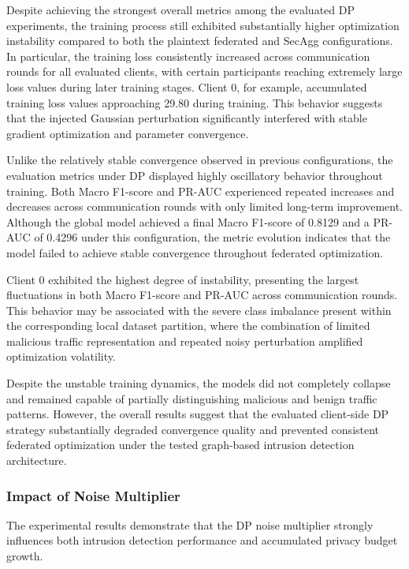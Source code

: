 \documentclass[conference]{IEEEtran}
\begin{document}
Despite achieving the strongest overall metrics among the evaluated DP experiments, the training process still exhibited substantially higher optimization instability compared to both the plaintext federated and SecAgg configurations. In particular, the training loss consistently increased across communication rounds for all evaluated clients, with certain participants reaching extremely large loss values during later training stages. Client 0, for example, accumulated training loss values approaching 29.80 during training. This behavior suggests that the injected Gaussian perturbation significantly interfered with stable gradient optimization and parameter convergence.

Unlike the relatively stable convergence observed in previous configurations, the evaluation metrics under DP displayed highly oscillatory behavior throughout training. Both Macro F1-score and PR-AUC experienced repeated increases and decreases across communication rounds with only limited long-term improvement. Although the global model achieved a final Macro F1-score of 0.8129 and a PR-AUC of 0.4296 under this configuration, the metric evolution indicates that the model failed to achieve stable convergence throughout federated optimization.

Client 0 exhibited the highest degree of instability, presenting the largest fluctuations in both Macro F1-score and PR-AUC across communication rounds. This behavior may be associated with the severe class imbalance present within the corresponding local dataset partition, where the combination of limited malicious traffic representation and repeated noisy perturbation amplified optimization volatility.

Despite the unstable training dynamics, the models did not completely collapse and remained capable of partially distinguishing malicious and benign traffic patterns. However, the overall results suggest that the evaluated client-side DP strategy substantially degraded convergence quality and prevented consistent federated optimization under the tested graph-based intrusion detection architecture.

\subsubsection{Impact of Noise Multiplier}

The experimental results demonstrate that the DP noise multiplier strongly influences both intrusion detection performance and accumulated privacy budget growth.
\end{document}
